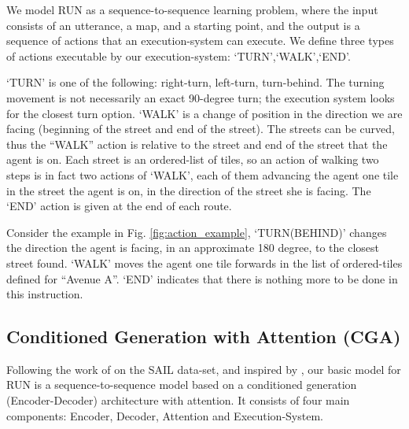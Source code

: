 \documentclass[11pt,a4paper]{article}
\begin{document}
We model RUN as a sequence-to-sequence learning problem, where the input consists of an utterance, a map, and a starting point, and the output is a sequence of actions that an execution-system can execute.   We define three types of actions executable by our execution-system:
\enquote*{TURN},\enquote*{WALK},\enquote*{END}.%

\enquote*{TURN} is one of the following: right-turn, left-turn, turn-behind. The turning movement is not necessarily an exact 90-degree turn; the execution system looks for the closest turn option. 
\enquote*{WALK} is a change of position in the direction we are facing (beginning of the street and end of the street). The streets can be curved, thus the \enquote{WALK} action is relative to the street and end of the street that the agent is on. Each street is an ordered-list of tiles, so an action of walking two steps is in fact two actions of \enquote*{WALK}, each of them advancing the agent one tile in the  street the agent is on, in the direction of the street she is facing.
The \enquote*{END} action is given at the end of each route.
 
 
Consider the example in Fig. \ref{fig:action_example}, \enquote*{TURN(BEHIND)} changes the direction the agent is facing, in an approximate 180 degree, to the closest street found. \enquote*{WALK} moves the agent one tile forwards in the list of ordered-tiles defined for \enquote{Avenue A}. \enquote*{END} indicates that there is nothing more to be done in this instruction.  



\subsection{Conditioned Generation with Attention (CGA)}
Following the work of \citet{mei2015listen} on the SAIL data-set, and inspired by \citet{xu2015show}, our basic model for RUN is a sequence-to-sequence model based on a conditioned generation (Encoder-Decoder) architecture with attention. It consists of four main components: Encoder, Decoder, Attention and Execution-System.
\end{document}
